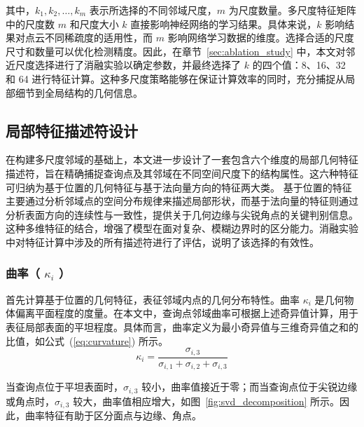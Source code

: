 其中，$k_1, k_2, \ldots, k_m$ 表示所选择的不同邻域尺度，$m$ 为尺度数量。多尺度特征矩阵中的尺度数 $m$ 和尺度大小 $k$ 直接影响神经网络的学习结果。具体来说，$k$ 影响结果对点云不同稀疏度的适用性，而 $m$ 影响网络学习数据的维度。选择合适的尺度尺寸和数量可以优化检测精度。因此，在章节~\ref{sec:ablation_study} 中，本文对邻近尺度选择进行了消融实验以确定参数，并最终选择了 $k$ 的四个值：8、16、32 和 64 进行特征计算。这种多尺度策略能够在保证计算效率的同时，充分捕捉从局部细节到全局结构的几何信息。

\subsection{局部特征描述符设计}
\label{sec:feature_computation}

在构建多尺度邻域的基础上，本文进一步设计了一套包含六个维度的局部几何特征描述符，旨在精确捕捉查询点及其邻域在不同空间尺度下的结构属性。这六种特征可归纳为基于位置的几何特征与基于法向量方向的特征两大类。
基于位置的特征主要通过分析邻域点的空间分布规律来描述局部形状，而基于法向量的特征则通过分析表面方向的连续性与一致性，提供关于几何边缘与尖锐角点的关键判别信息。这种多维特征的结合，增强了模型在面对复杂、模糊边界时的区分能力。消融实验中对特征计算中涉及的所有描述符进行了评估，说明了该选择的有效性。

\subsubsection{曲率（ $\kappa_i$ ）}
首先计算基于位置的几何特征，表征邻域内点的几何分布特性。曲率 $\kappa_i$ 是几何物体偏离平面程度的度量。在本文中，查询点邻域曲率可根据上述奇异值计算，用于表征局部表面的平坦程度。具体而言，曲率定义为最小奇异值与三维奇异值之和的比值，如公式~(\ref{eq:curvature}) 所示。
\begin{equation}
    \kappa_i = \frac{\sigma_{i,3}}{\sigma_{i,1} + \sigma_{i,2} + \sigma_{i,3}}
    \label{eq:curvature}
\end{equation}

当查询点位于平坦表面时，$\sigma_{i,3}$ 较小，曲率值接近于零；而当查询点位于尖锐边缘或角点时，$\sigma_{i,3}$ 较大，曲率值相应增大，如图~\ref{fig:svd_decomposition} 所示。因此，曲率特征有助于区分面点与边缘、角点。

